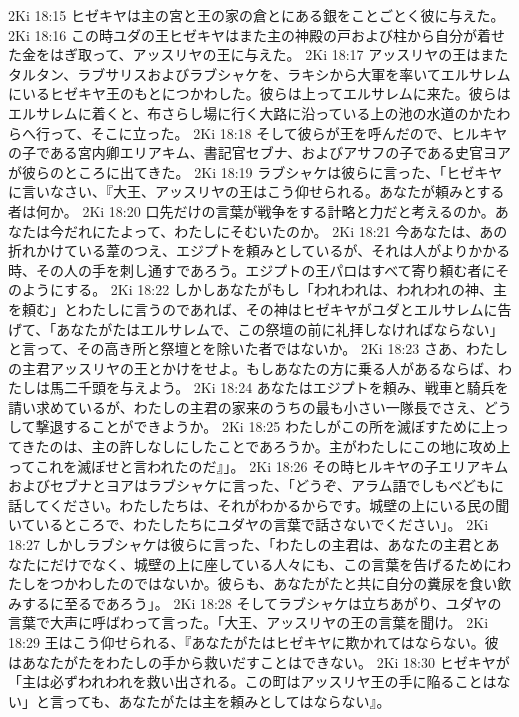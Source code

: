 2Ki 18:15  ヒゼキヤは主の宮と王の家の倉とにある銀をことごとく彼に与えた。
2Ki 18:16  この時ユダの王ヒゼキヤはまた主の神殿の戸および柱から自分が着せた金をはぎ取って、アッスリヤの王に与えた。
2Ki 18:17  アッスリヤの王はまたタルタン、ラブサリスおよびラブシャケを、ラキシから大軍を率いてエルサレムにいるヒゼキヤ王のもとにつかわした。彼らは上ってエルサレムに来た。彼らはエルサレムに着くと、布さらし場に行く大路に沿っている上の池の水道のかたわらへ行って、そこに立った。
2Ki 18:18  そして彼らが王を呼んだので、ヒルキヤの子である宮内卿エリアキム、書記官セブナ、およびアサフの子である史官ヨアが彼らのところに出てきた。
2Ki 18:19  ラブシャケは彼らに言った、「ヒゼキヤに言いなさい、『大王、アッスリヤの王はこう仰せられる。あなたが頼みとする者は何か。
2Ki 18:20  口先だけの言葉が戦争をする計略と力だと考えるのか。あなたは今だれにたよって、わたしにそむいたのか。
2Ki 18:21  今あなたは、あの折れかけている葦のつえ、エジプトを頼みとしているが、それは人がよりかかる時、その人の手を刺し通すであろう。エジプトの王パロはすべて寄り頼む者にそのようにする。
2Ki 18:22  しかしあなたがもし「われわれは、われわれの神、主を頼む」とわたしに言うのであれば、その神はヒゼキヤがユダとエルサレムに告げて、「あなたがたはエルサレムで、この祭壇の前に礼拝しなければならない」と言って、その高き所と祭壇とを除いた者ではないか。
2Ki 18:23  さあ、わたしの主君アッスリヤの王とかけをせよ。もしあなたの方に乗る人があるならば、わたしは馬二千頭を与えよう。
2Ki 18:24  あなたはエジプトを頼み、戦車と騎兵を請い求めているが、わたしの主君の家来のうちの最も小さい一隊長でさえ、どうして撃退することができようか。
2Ki 18:25  わたしがこの所を滅ぼすために上ってきたのは、主の許しなしにしたことであろうか。主がわたしにこの地に攻め上ってこれを滅ぼせと言われたのだ』」。
2Ki 18:26  その時ヒルキヤの子エリアキムおよびセブナとヨアはラブシャケに言った、「どうぞ、アラム語でしもべどもに話してください。わたしたちは、それがわかるからです。城壁の上にいる民の聞いているところで、わたしたちにユダヤの言葉で話さないでください」。
2Ki 18:27  しかしラブシャケは彼らに言った、「わたしの主君は、あなたの主君とあなたにだけでなく、城壁の上に座している人々にも、この言葉を告げるためにわたしをつかわしたのではないか。彼らも、あなたがたと共に自分の糞尿を食い飲みするに至るであろう」。
2Ki 18:28  そしてラブシャケは立ちあがり、ユダヤの言葉で大声に呼ばわって言った。「大王、アッスリヤの王の言葉を聞け。
2Ki 18:29  王はこう仰せられる、『あなたがたはヒゼキヤに欺かれてはならない。彼はあなたがたをわたしの手から救いだすことはできない。
2Ki 18:30  ヒゼキヤが「主は必ずわれわれを救い出される。この町はアッスリヤ王の手に陥ることはない」と言っても、あなたがたは主を頼みとしてはならない』。
